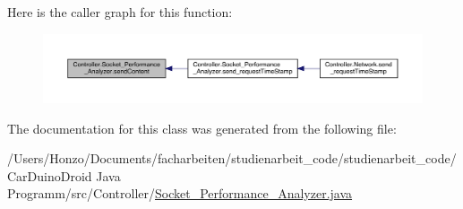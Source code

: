 Here is the caller graph for this function\+:
\nopagebreak
\begin{figure}[H]
\begin{center}
\leavevmode
\includegraphics[width=350pt]{class_controller_1_1_socket___performance___analyzer_a305e1a94a23c557b3afa7f73775f8dd9_icgraph}
\end{center}
\end{figure}




The documentation for this class was generated from the following file\+:\begin{DoxyCompactItemize}
\item 
/\+Users/\+Honzo/\+Documents/facharbeiten/studienarbeit\+\_\+code/studienarbeit\+\_\+code/\+Car\+Duino\+Droid Java Programm/src/\+Controller/\hyperlink{_socket___performance___analyzer_8java}{Socket\+\_\+\+Performance\+\_\+\+Analyzer.\+java}\end{DoxyCompactItemize}

